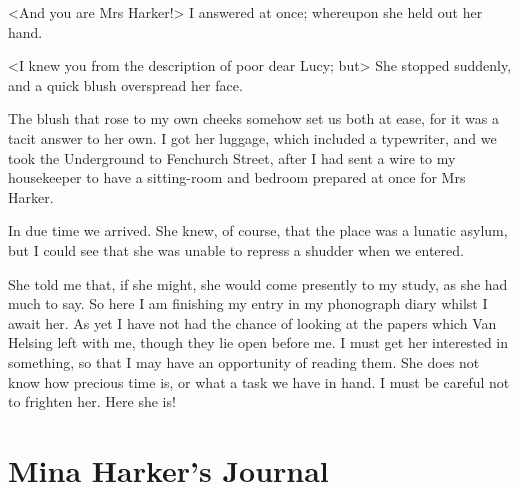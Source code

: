<And you are Mrs Harker!> I answered at once; whereupon she held out her hand.

<I knew you from the description of poor dear Lucy; but\longdash> She stopped suddenly, and a quick blush overspread her face.

The blush that rose to my own cheeks somehow set us both at ease, for it was a tacit answer to her own. I got her luggage, which included a typewriter, and we took the Underground to Fenchurch Street, after I had sent a wire to my housekeeper to have a sitting-room and bedroom prepared at once for Mrs Harker.

In due time we arrived. She knew, of course, that the place was a lunatic asylum, but I could see that she was unable to repress a shudder when we entered.

She told me that, if she might, she would come presently to my study, as she had much to say. So here I am finishing my entry in my phonograph diary whilst I await her. As yet I have not had the chance of looking at the papers which Van Helsing left with me, though they lie open before me. I must get her interested in something, so that I may have an opportunity of reading them. She does not know how precious time is, or what a task we have in hand. I must be careful not to frighten her. Here she is!

\section{Mina Harker's Journal}

